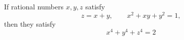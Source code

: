 \begin{proposition}
    If rational numbers $x,y,z$ satisfy
\[
    z=x+y,\qquad x^2+xy+y^2=1,
\]
    then they satisfy
\[
    x^4+y^4+z^4=2
\]
\end{proposition}
